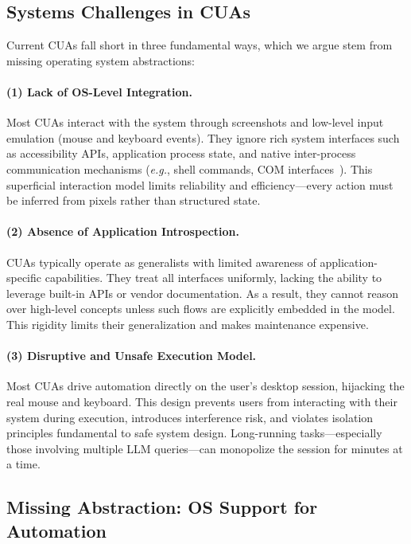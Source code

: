 \documentclass[sigplan,10pt]{acmart}
\newcommand{\eg}{\textit{e.g.},\xspace}
\begin{document}
\subsection{Systems Challenges in CUAs}

Current CUAs fall short in three fundamental ways, which we argue stem from missing operating system abstractions:

\paragraph{(1) Lack of OS-Level Integration.}
Most CUAs interact with the system through screenshots and low-level input emulation (mouse and keyboard events). They ignore rich system interfaces such as accessibility APIs, application process state, and native inter-process communication mechanisms (\eg shell commands, COM interfaces~\cite{gray1998modern}). This superficial interaction model limits reliability and efficiency—every action must be inferred from pixels rather than structured state.

\paragraph{(2) Absence of Application Introspection.}
CUAs typically operate as generalists with limited awareness of application-specific capabilities. They treat all interfaces uniformly, lacking the ability to leverage built-in APIs or vendor documentation. As a result, they cannot reason over high-level concepts unless such flows are explicitly embedded in the model. This rigidity limits their generalization and makes maintenance expensive.

\paragraph{(3) Disruptive and Unsafe Execution Model.}
Most CUAs drive automation directly on the user's desktop session, hijacking the real mouse and keyboard. This design prevents users from interacting with their system during execution, introduces interference risk, and violates isolation principles fundamental to safe system design. Long-running tasks—especially those involving multiple LLM queries—can monopolize the session for minutes at a time.

\subsection{Missing Abstraction: OS Support for Automation}
\end{document}
